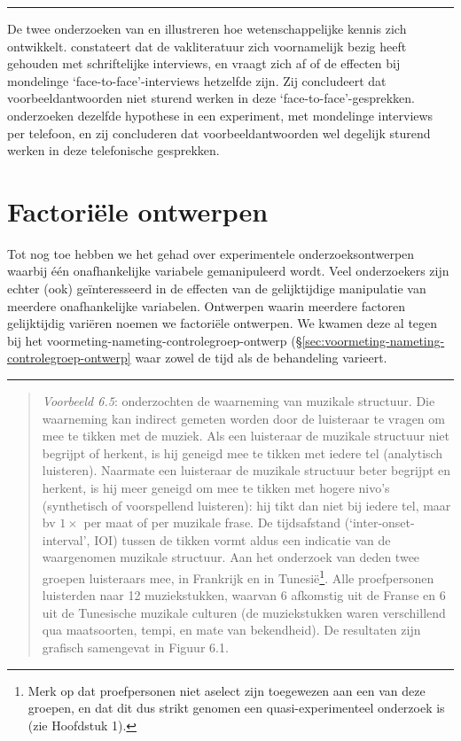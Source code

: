 \documentclass[
]{book}
\begin{document}
\begin{center}\rule{0.5\linewidth}{0.5pt}\end{center}

De twee onderzoeken van \citep{Houtk91} en \citep{Wijff92} illustreren hoe wetenschappelijke kennis zich
ontwikkelt. \citep{Houtk91} constateert dat de vakliteratuur zich voornamelijk bezig
heeft gehouden met schriftelijke interviews, en vraagt zich af of de
effecten bij mondelinge `face-to-face'-interviews hetzelfde zijn. Zij
concludeert dat voorbeeldantwoorden niet sturend werken in deze
`face-to-face'-gesprekken. \citep{Wijff92} onderzoeken dezelfde hypothese in een
experiment, met mondelinge interviews per telefoon, en zij concluderen
dat voorbeeldantwoorden wel degelijk sturend werken in deze telefonische
gesprekken.

\hypertarget{sec:ontwerp.factorieel}{%
\section{Factoriële ontwerpen}\label{sec:ontwerp.factorieel}}

Tot nog toe hebben we het gehad over experimentele onderzoeksontwerpen
waarbij één onafhankelijke variabele gemanipuleerd wordt. Veel
onderzoekers zijn echter (ook) geïnteresseerd in de effecten van de
gelijktijdige manipulatie van meerdere onafhankelijke variabelen.
Ontwerpen waarin meerdere factoren gelijktijdig variëren noemen we
factoriële ontwerpen. We kwamen deze al tegen bij het
voormeting-nameting-controlegroep-ontwerp
(§\ref{sec:voormeting-nameting-controlegroep-ontwerp}
waar zowel de tijd als de behandeling varieert.

\begin{center}\rule{0.5\linewidth}{0.5pt}\end{center}

\begin{quote}
\emph{Voorbeeld 6.5}: \citep{Drake03}
onderzochten de waarneming van muzikale structuur. Die waarneming kan
indirect gemeten worden door de luisteraar te vragen om mee te tikken
met de muziek. Als een luisteraar de muzikale structuur niet begrijpt of
herkent, is hij geneigd mee te tikken met iedere tel (analytisch
luisteren). Naarmate een luisteraar de muzikale structuur beter begrijpt
en herkent, is hij meer geneigd om mee te tikken met hogere nivo's
(synthetisch of voorspellend luisteren): hij tikt dan niet bij iedere
tel, maar bv \(1\times\) per maat of per muzikale frase. De tijdsafstand
(`inter-onset-interval', IOI) tussen de tikken vormt aldus een indicatie
van de waargenomen muzikale structuur. Aan het onderzoek van deden twee
groepen luisteraars mee, in Frankrijk en in Tunesië\footnote{Merk op dat proefpersonen niet aselect zijn toegewezen aan een van deze groepen, en dat dit dus strikt genomen een quasi-experimenteel onderzoek is (zie Hoofdstuk 1).}. Alle
proefpersonen luisterden naar 12 muziekstukken, waarvan 6 afkomstig uit
de Franse en 6 uit de Tunesische muzikale culturen (de muziekstukken
waren verschillend qua maatsoorten, tempi, en mate van bekendheid). De
resultaten zijn grafisch samengevat in Figuur 6.1.
\end{quote}
\end{document}
